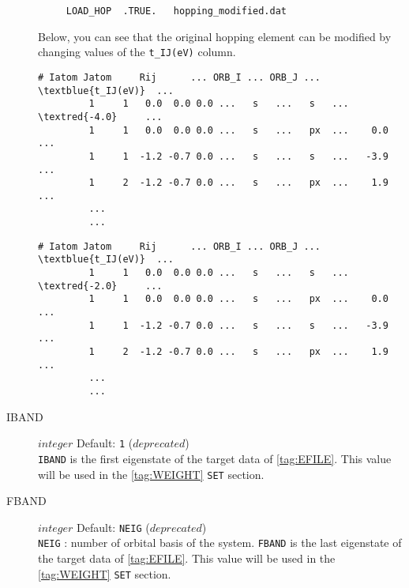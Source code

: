 \documentclass[a4paper,12pt]{scrartcl}
\makeatletter
\def\namedlabel#1#2{\begingroup
    #2%
    \def\@currentlabel{#2}%
    \phantomsection\label{#1}\endgroup
}
\newcommand{\textred}[1]{\textcolor{red!85!white}{\texttt{#1}}}
\newcommand{\textblue}[1]{\textcolor{blue!85!white}{\texttt{#1}}}
\makeatother
\begin{document}
\begin{description}
    \begin{verbatim}
     LOAD_HOP  .TRUE.   hopping_modified.dat
    \end{verbatim}

		Below, you can see that the original hopping element can be modified by changing values of the \textblue{t\_IJ(eV)} column.  
        \begin{Verbatim}[commandchars=\\\{\},gobble=4, frame=single, framesep=2mm, 
            label= hopping.dat example file, 
            labelposition=bottomline]
     # Iatom Jatom     Rij      ... ORB_I ... ORB_J ...  \textblue{t_IJ(eV)}  ... 
         1     1   0.0  0.0 0.0 ...   s   ...   s   ...   \textred{-4.0}     ... 
         1     1   0.0  0.0 0.0 ...   s   ...   px  ...    0.0     ... 
         1     1  -1.2 -0.7 0.0 ...   s   ...   s   ...   -3.9     ... 
         1     2  -1.2 -0.7 0.0 ...   s   ...   px  ...    1.9     ... 
         ...
         ...
        \end{Verbatim}

        \begin{Verbatim}[commandchars=\\\{\},gobble=4, frame=single, framesep=2mm, 
            label= hopping\_modified.dat example file, 
            labelposition=bottomline]
     # Iatom Jatom     Rij      ... ORB_I ... ORB_J ...  \textblue{t_IJ(eV)}  ... 
         1     1   0.0  0.0 0.0 ...   s   ...   s   ...   \textred{-2.0}     ... 
         1     1   0.0  0.0 0.0 ...   s   ...   px  ...    0.0     ... 
         1     1  -1.2 -0.7 0.0 ...   s   ...   s   ...   -3.9     ... 
         1     2  -1.2 -0.7 0.0 ...   s   ...   px  ...    1.9     ... 
         ...
         ...
        \end{Verbatim}


    \item[\namedlabel{tag:IBAND}{IBAND}] $integer$ Default: \texttt{1} ($deprecated$) \\
		\texttt{IBAND} is the first eigenstate of the target data of 
		\ref{tag:EFILE}. This value will be used in the \ref{tag:WEIGHT}
		\texttt{SET} section.

    \item[\namedlabel{tag:FBAND}{FBAND}] $integer$ Default: \texttt{NEIG} ($deprecated$) \\
		\texttt{NEIG} : number of orbital basis of the system.
		\texttt{FBAND} is the last eigenstate of the target data of 
		\ref{tag:EFILE}. This value will be used in the \ref{tag:WEIGHT}
		\texttt{SET} section.


\end{description}
\end{document}
